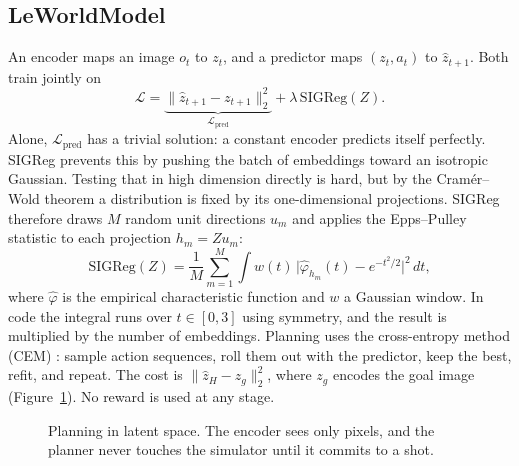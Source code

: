 \documentclass[10pt,twocolumn]{article}
\newcommand{\Lpred}{\mathcal{L}_{\text{pred}}}
\begin{document}
\subsection{LeWorldModel}
An encoder maps an image $o_t$ to $z_t$, and a predictor maps $(z_t,a_t)$ to $\hat z_{t+1}$. Both train jointly on
\begin{equation}
\mathcal{L}=\underbrace{\lVert \hat z_{t+1}-z_{t+1}\rVert_2^2}_{\Lpred}+\lambda\,\mathrm{SIGReg}(Z).
\end{equation}
Alone, $\Lpred$ has a trivial solution: a constant encoder predicts itself perfectly. SIGReg prevents this by pushing the batch of embeddings toward an isotropic Gaussian. Testing that in high dimension directly is hard, but by the Cram\'er--Wold theorem \cite{cramer1936theorems} a distribution is fixed by its one-dimensional projections. SIGReg therefore draws $M$ random unit directions $u_m$ and applies the Epps--Pulley statistic \cite{epps1983test} to each projection $h_m=Zu_m$:
\begin{equation}
\mathrm{SIGReg}(Z)=\frac{1}{M}\sum_{m=1}^{M}\int w(t)\,\bigl|\hat\varphi_{h_m}(t)-e^{-t^2/2}\bigr|^2\,dt,
\end{equation}
where $\hat\varphi$ is the empirical characteristic function and $w$ a Gaussian window. In code the integral runs over $t\in[0,3]$ using symmetry, and the result is multiplied by the number of embeddings. Planning uses the cross-entropy method (CEM) \cite{rubinstein1999cem}: sample action sequences, roll them out with the predictor, keep the best, refit, and repeat. The cost is $\lVert\hat z_H-z_g\rVert_2^2$, where $z_g$ encodes the goal image (Figure~\ref{fig:pipeline}). No reward is used at any stage.

\begin{figure}[t]
\centering
{}
\caption{Planning in latent space. The encoder sees only pixels, and the planner never touches the simulator until it commits to a shot.}
\label{fig:pipeline}
\end{figure}
\end{document}
